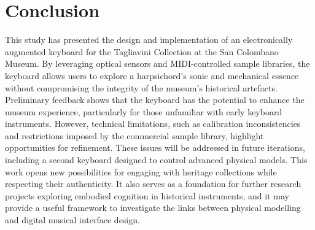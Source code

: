 \section{Conclusion}\label{conclusion}

This study has presented the design and implementation of an electronically augmented keyboard for the Tagliavini Collection at the San Colombano Museum. By leveraging optical sensors and MIDI-controlled sample libraries, the keyboard allows users to explore a harpsichord's sonic and mechanical essence without compromising the integrity of the museum's historical artefacts. Preliminary feedback shows that the keyboard has the potential to enhance the museum experience, particularly for those unfamiliar with early keyboard instruments. However, technical limitations, such as calibration inconsistencies and restrictions imposed by the commercial sample library, highlight opportunities for refinement. These issues will be addressed in future iterations, including a second keyboard designed to control advanced physical models. This work opens new possibilities for engaging with heritage collections while respecting their authenticity. It also serves as a foundation for further research projects exploring embodied cognition in historical instruments, and it may provide a useful framework to investigate the links between physical modelling and digital musical interface design.

